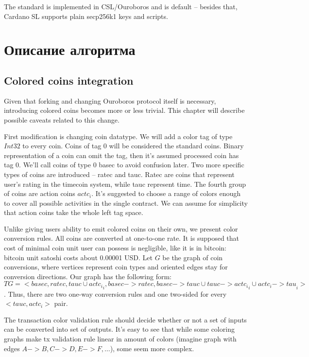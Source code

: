 \documentclass[]{itmo-student-thesis}
\begin{document}
The standard is implemented in CSL/Ouroboros and is default -- besides
that, Cardano SL supports plain secp256k1 keys and scripts.

\chapter{Описание алгоритма}

\section{Colored coins integration}

Given that forking and changing Ouroboros protocol itself is
necessary, introducing colored coins becomes more or less
trivial. This chapter will describe possible caveats related to this
change.

First modification is changing coin datatype. We will add a color tag
of type $Int32$ to every coin. Coins of tag $0$ will be considered the
standard coins. Binary representation of a coin can omit the tag, then
it’s assumed processed coin has tag 0. We’ll call coins of type $0$
basec to avoid confusion later. Two more specific types of coins are
introduced -- ratec and tauc. Ratec are coins that represent user’s
rating in the timecoin system, while tauc represent time. The fourth
group of coins are action coins $actc_i$. It’s suggested to choose a
range of colors enough to cover all possible activities in the single
contract. We can assume for simplicity that action coins take the
whole left tag space.

Unlike giving users ability to emit colored coins on their own, we
present color conversion rules.  All coins are converted at one-to-one
rate. It is supposed that cost of minimal coin unit user can possess
is negligible, like it is in bitcoin: bitcoin unit satoshi costs about
0.00001 USD. Let $G$ be the graph of coin conversions, where vertices
represent coin types and oriented edges stay for conversion
directions. Our graph has the following form: $TG = <{basec, ratec,
  tauc} \cup {actc_i}_i, {basec -> ratec, basec -> tauc} \cup {tauc ->
  actc_i}_i \cup {actc_i -> tau}_i>$. Thus, there are two one-way
conversion rules and one two-sided for every $<tauc, actc_i>$ pair.

The transaction color validation rule should decide whether or not a
set of inputs can be converted into set of outputs. It’s easy to see
that while some coloring graphs make tx validation rule linear in
amount of colors (imagine graph with edges ${A -> B, C -> D, E ->F,
  …}$), some seem more complex.
\end{document}
